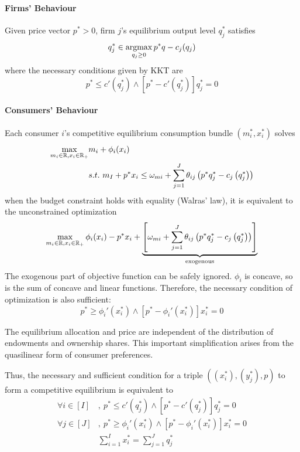 \documentclass{article}
\begin{document}
	 	\paragraph{Firms' Behaviour} Given price vector $p^* > 0$, firm $j$'s equilibrium output level $q_j^*$ satisfies
	 		\begin{equation}
	 			q_j^* \in \operatorname*{argmax}_{q_j \geq 0} p^* q - c_j(q_j)
	 		\end{equation}
	 		where the necessary conditions given by KKT are
	 		\begin{equation}
	 			p^* \leq c'(q_j^*) \land [p^* - c'(q_j^*)] q_j^* = 0 
	 		\end{equation}
	 	\paragraph{Consumers' Behaviour} Each consumer $i$'s competitive equilibrium consumption bundle $(m_i^*, x_i^*)$ solves
	 		\begin{align}
	 			\max_{m_i \in \mathbb{R}, x_i \in \mathbb{R}_+}& m_i + \phi_i(x_i) \\
	 			&s.t.\ m_{I}+p^{*} x_{i} \leq \omega_{m i}+\sum_{j=1}^{J} \theta_{i j}\left(p^{*} q_{j}^{*}-c_{j}\left(q_{j}^{*}\right)\right)
	 		\end{align}
	 		when the budget constraint holds with equality (Walras' law), it is equivalent to the unconstrained optimization
	 		\begin{equation}
	 			\max_{m_i \in \mathbb{R}, x_i \in \mathbb{R}_+}
	 			\phi_i(x_i) - p^* x_i 
	 			+ \underbrace{\left [
	 			\omega_{m i}
	 			+ \sum_{j=1}^{J} \theta_{i j}\left(p^{*} q_{j}^{*}-c_{j}\left(q_{j}^{*}\right)\right)
	 			\right]}_{\text{{exogenous}}}
	 		\end{equation}
	 		The exogenous part of objective function can be safely ignored. $\phi_i$ is concave, so is the sum of concave and linear functions. Therefore, the necessary condition of optimization is also sufficient:
	 		\begin{equation}
	 			p^* \geq \phi_i'(x_i^*) \land [p^* - \phi_i'(x_i^*)] x_i^* = 0
	 		\end{equation}
	 		\begin{remark}
	 			The equilibrium allocation and price are independent of the distribution of endowments and ownership shares. This important simplification arises from the quasilinear form of consumer preferences.
	 		\end{remark}
	 		
	 		\par Thus, the necessary and sufficient condition for a triple $((x^*_i), (y^*_j), p)$ to form a competitive equilibrium is equivalent to
	 		\begin{align}
	 			\forall i \in [I]&,\ p^* \leq c'(q_j^*) \land [p^* - c'(q_j^*)] q_j^* = 0\\
	 			\forall j \in [J]&,\ p^* \geq \phi_i'(x_i^*) \land [p^* - \phi_i'(x_i^*)] x_i^* = 0\\
	 			&\sum_{i=1}^{I} x_{i}^{*}=\sum_{j=1}^{J} q_{j}^{*}
	 		\end{align}
	 	
\end{document}
